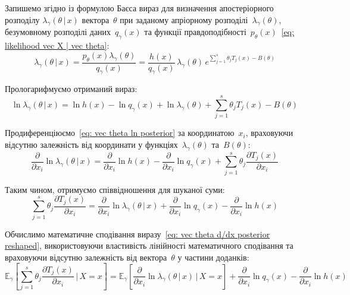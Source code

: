 \documentclass{mathreport}
\begin{document}
Запишемо згідно із формулою Баєса вираз для визначення апостеріорного розподілу $\lambda_{\gamma}(\theta \,|\, x)$ вектора~$\theta$ при заданому апріорному розподілі~$\lambda_{\gamma}(\theta)$, безумовному розподілі даних~$q_{\gamma}(x)$ та функції правдоподібності~$p_{\theta}(x)$~\eqref{eq: likelihood vec X | vec theta}:
\begin{equation}\label{eq: vec theta posterior}
    \lambda_{\gamma}(\theta \,|\, x) = \frac{p_{\theta}(x)\lambda_{\gamma}(\theta)}{q_{\gamma}(x)} = 
    \frac{h(x)}{q_{\gamma}(x)}\,\lambda_{\gamma}(\theta)\,e^{\sum\limits_{j=1}^{s}\theta_j T_j(x) - B(\theta)}
\end{equation}

Прологарифмуємо отриманий вираз:
\begin{equation}\label{eq: vec theta ln posterior}
    \ln{\lambda_{\gamma}(\theta \,|\, x)} = \ln{h(x)} - \ln{q_{\gamma}(x)} + \ln{\lambda_{\gamma}(\theta)} + \sum\limits_{j=1}^{s}\theta_j T_j(x) - B(\theta)
\end{equation}

Продиференціюємо~\eqref{eq: vec theta ln posterior} за координатою~$x_i$, враховуючи відсутню залежність від координати у функціях~$\lambda_{\gamma}(\theta)$ та~$B(\theta):$
\begin{equation}\label{eq: vec theta d/dx posterior}
    \frac{\partial}{\partial x_i}\ln{\lambda_{\gamma}(\theta \,|\, x)} = \frac{\partial}{\partial x_i}\ln{h(x)} - \frac{\partial}{\partial x_i}\ln{q_{\gamma}(x)} + \sum\limits_{j=1}^{s}\theta_j \frac{\partial T_j(x)}{\partial x_i}
\end{equation}

Таким чином, отримуємо співвідношення для шуканої суми:
\begin{equation}\label{eq: vec theta d/dx posterior reshaped}
    \sum\limits_{j=1}^{s}\theta_j \frac{\partial T_j(x)}{\partial x_i} = \frac{\partial}{\partial x_i}\ln{\lambda_{\gamma}(\theta \,|\, x)} + \frac{\partial}{\partial x_i}\ln{q_{\gamma}(x)} - \frac{\partial}{\partial x_i}\ln{h(x)}
\end{equation}

Обчислимо математичне сподівання виразу~\eqref{eq: vec theta d/dx posterior reshaped}, використовуючи властивість лінійності математичного сподівання та враховуючи відсутню залежність від вектора~$\theta$ у частини доданків: 
\begin{equation}\label{eq: vec theta d/dx expectation posterior}
    \mathbb{E}_{\gamma}\left[ \sum\limits_{j=1}^{s}\theta_j \frac{\partial T_j(x)}{\partial x_i} \,|\, X=x \right] = \mathbb{E}_{\gamma}\left[ \frac{\partial}{\partial x_i}\ln{\lambda_{\gamma}(\theta \,|\, x)} \,|\, X=x \right] + \frac{\partial}{\partial x_i}\ln{q_{\gamma}(x)} - \frac{\partial}{\partial x_i}\ln{h(x)}
\end{equation}
\end{document}
